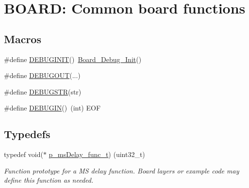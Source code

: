 \hypertarget{group___b_o_a_r_d___c_o_m_m_o_n___a_p_i}{}\section{B\+O\+A\+RD\+: Common board functions}
\label{group___b_o_a_r_d___c_o_m_m_o_n___a_p_i}
\subsection*{Macros}
\begin{DoxyCompactItemize}
\item 
\#define \hyperlink{group___b_o_a_r_d___c_o_m_m_o_n___a_p_i_ga5f3d8b382683793eb0b2723083f518f8}{D\+E\+B\+U\+G\+I\+N\+IT}()~\hyperlink{group___b_o_a_r_d___c_o_m_m_o_n___a_p_i_gabcba073f50ad637ee6bc852f64ea2ce6}{Board\+\_\+\+Debug\+\_\+\+Init}()
\item 
\#define \hyperlink{group___b_o_a_r_d___c_o_m_m_o_n___a_p_i_gacf358ee75cab3e9eb271e46bf983aaff}{D\+E\+B\+U\+G\+O\+UT}(...)
\item 
\#define \hyperlink{group___b_o_a_r_d___c_o_m_m_o_n___a_p_i_gaf1817cfaa7fbfb1c32ba55fa0d792d0b}{D\+E\+B\+U\+G\+S\+TR}(str)
\item 
\#define \hyperlink{group___b_o_a_r_d___c_o_m_m_o_n___a_p_i_gad87de76956f23e36f51356aaed5c18e4}{D\+E\+B\+U\+G\+IN}()~(int) E\+OF
\end{DoxyCompactItemize}
\subsection*{Typedefs}
\begin{DoxyCompactItemize}
\item 
typedef void($\ast$ \hyperlink{group___b_o_a_r_d___c_o_m_m_o_n___a_p_i_gae997487a4f312eb187c5e0201a7f1d5f}{p\+\_\+ms\+Delay\+\_\+func\+\_\+t}) (uint32\+\_\+t)
\begin{DoxyCompactList}\small\item\em Function prototype for a MS delay function. Board layers or example code may define this function as needed. \end{DoxyCompactList}\end{DoxyCompactItemize}
